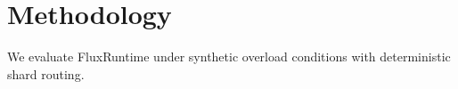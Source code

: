 \section{Methodology}

We evaluate FluxRuntime under synthetic overload conditions with deterministic shard routing.
